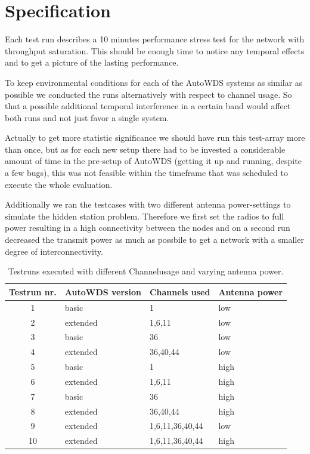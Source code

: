   \section{Specification}
    Each test run describes a 10 minutes performance stress test for the network with throughput saturation. 
    This should be enough time to notice any temporal effects and to get a picture of the lasting performance.
    
    To keep environmental conditions for each of the AutoWDS systems as similar as possible we conducted the runs alternatively with respect to channel usage.
    So that a possible additional temporal interference in a certain band would affect both runs and not just favor a single system.
  
    Actually to get more statistic significance we should have run this test-array more than once, but as for each new setup there had to 
    be invested a considerable amount of time in the pre-setup of AutoWDS (getting it up and running, despite a few bugs), this was not feasible within
    the timeframe that was scheduled to execute the whole evaluation.
    
    Additionally we ran the testcases with two different antenna power-settings to simulate the hidden station problem. Therefore we first set the radios to full power 
    resulting in a high connectivity between the nodes and on a second run decreased the transmit power as much as possbile to get a network with a smaller degree
    of interconnectivity.
  
    \begin{table}[h!]
      \centering
      \begin{tabular}{clll}
	Testrun nr. & AutoWDS version & Channels used & Antenna power\\ \hline
	1 & basic & 1 & low \\
	2 & extended & 1,6,11 & low \\
	3 & basic & 36 & low \\
	4 & extended & 36,40,44 & low \\
	5 & basic & 1 & high \\
	6 & extended & 1,6,11 & high \\
	7 & basic & 36 & high \\
	8 & extended & 36,40,44 & high \\
	9 & extended & 1,6,11,36,40,44 & low \\
	10 & extended & 1,6,11,36,40,44 & high \\
      \end{tabular}
      \caption{Testruns executed with different Channelusage and varying antenna power.}
      \label{tab:testruns}
    \end{table}
    
